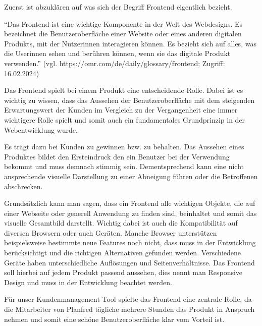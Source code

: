 Zuerst ist abzuklären auf was sich der Begriff Frontend eigentlich bezieht.

“Das Frontend ist eine wichtige Komponente in der Welt des Webdesigns. Es bezeichnet die Benutzeroberfläche einer Website oder eines anderen digitalen Produkts, mit der Nutzerinnen interagieren können. Es bezieht sich auf alles, was die Userinnen sehen und berühren können, wenn sie das digitale Produkt verwenden.”
\newline
(vgl. https://omr.com/de/daily/glossary/frontend; Zugriff: 16.02.2024)

Das Frontend spielt bei einem Produkt eine entscheidende Rolle. Dabei ist es wichtig zu wissen, dass das Aussehen der Benutzeroberfläche mit dem steigenden Erwartungswert der Kunden im Vergleich zu der Vergangenheit eine immer wichtigere Rolle spielt und somit auch ein fundamentales Grundprinzip in der Webentwicklung wurde. 

Es trägt dazu bei Kunden zu gewinnen bzw. zu behalten. Das Aussehen eines Produktes bildet den Ersteindruck den ein Benutzer bei der Verwendung bekommt und muss demnach stimmig sein. Dementsprechend kann eine nicht ansprechende visuelle Darstellung zu einer Abneigung führen oder die Betroffenen abschrecken. 

Grundsätzlich kann man sagen, dass ein Frontend alle wichtigen Objekte, die auf einer Webseite oder generell Anwendung zu finden sind, beinhaltet und somit das visuelle Gesamtbild darstellt. Wichtig dabei ist auch die Kompatibilität auf diversen Browsern oder auch Geräten. Manche Browser unterstützen beispielsweise bestimmte neue Features noch nicht, dass muss in der Entwicklung berücksichtigt und die richtigen Alternativen gefunden werden. Verschiedene Geräte haben unterschiedliche Auflösungen und Seitenverhältnisse. Das Frontend soll hierbei auf jedem Produkt passend aussehen, dies nennt man Responsive Design und muss in der Entwicklung beachtet werden.

Für unser Kundenmanagement-Tool spielte das Frontend eine zentrale Rolle, da die Mitarbeiter von Planfred tägliche mehrere Stunden das Produkt in Anspruch nehmen und somit eine schöne Benutzeroberfläche klar vom Vorteil ist.

\cite{frontend_grundlagen}
